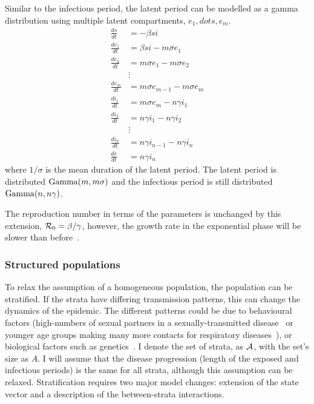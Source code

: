 \documentclass[thesis.tex]{subfiles}
\begin{document}
Similar to the infectious period, the latent period can be modelled as a gamma distribution using multiple latent compartments, $e_1, dots, e_m$.
\begin{align}
\frac{ds}{dt} &= -\beta si \\
\frac{de_1}{dt} &= \beta si - m\sigma e_1 \\
\frac{de_2}{dt} &= m\sigma e_1 - m \sigma e_2 \\
&\vdots \nonumber \\
\frac{de_m}{dt} &= m\sigma e_{m-1} - m \sigma e_m \\
\frac{di_1}{dt} &= m\sigma e_m - n\gamma i_1 \\
\frac{di_2}{dt} &= n\gamma i_1 - n \gamma i_2 \\
&\vdots \nonumber \\
\frac{di_n}{dt} &= n\gamma i_{n-1} - n \gamma i_n \\
\frac{dr}{dt} &= n\gamma i_n
\end{align}
where $1/\sigma$ is the mean duration of the latent period.
The latent period is distributed $\operatorname{Gamma}(m, m\sigma)$ and the infectious period is still distributed $\operatorname{Gamma}(n, n\gamma)$.

The reproduction number in terms of the parameters is unchanged by this extension, \ie $\mathcal{R}_{0} = \beta / \gamma$, however, the growth rate in the exponential phase will be slower than before~\autocite[41]{keelingModeling}.

\subsubsection{Structured populations} \label{SEIR:sec:structured-populations}

To relax the assumption of a homogeneous population, the population can be stratified.
If the strata have differing transmission patterns, this can change the dynamics of the epidemic.
The different patterns could be due to behavioural factors (\eg high-numbers of sexual partners in a sexually-transmitted disease~\autocite[69]{keelingModeling} or younger age groups making many more contacts for respiratory diseases~\autocite[176]{andersonInfectious}), or biological factors such as genetics~\autocite[208]{andersonInfectious}.
I denote the set of strata, as $\mathcal{A}$, with the set's size as $A$.
I will assume that the disease progression (\ie length of the exposed and infectious periods) is the same for all strata, although this assumption can be relaxed.
Stratification requires two major  model changes: extension of the state vector and a description of the between-strata interactions.
\end{document}
